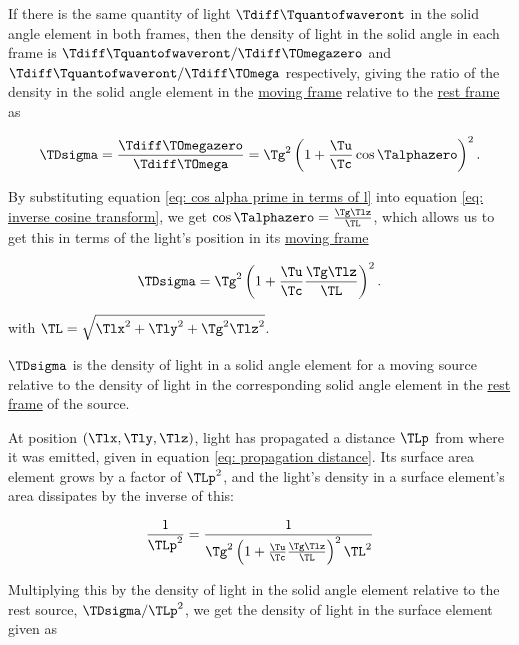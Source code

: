 \begin{derivation}
	If there is the same quantity of light $\Tdiff \Tquantofwaveront $ in the solid angle element in both frames, then the density of light in the solid angle in each frame is $\Tdiff \Tquantofwaveront /\Tdiff \TOmegazero $ and $\Tdiff \Tquantofwaveront /\Tdiff \TOmega $ respectively, giving the ratio of the density in the solid angle element in the \hyperlink{def-Moving-Frame}{moving frame} relative to the \hyperlink{def-proper-frame}{rest frame} as

	\begin{equation}
		\TDsigma  = \frac{\Tdiff \TOmegazero }{\Tdiff \TOmega } = \Tg ^2\left(1 + \dfrac{\Tu }{\Tc }\cos{\Talphazero }\right)^2.
	\end{equation}

	By substituting equation \eqref{eq: cos alpha prime in terms of l} into equation \eqref{eq: inverse cosine transform}, we get $\cos\Talphazero =\frac{\Tg  \Tlz  }{\TL }$, which allows us to get this in terms of the light's position in its \hyperlink{def-Moving-Frame}{moving frame}

	\begin{equation}
		\TDsigma  = \Tg ^2 \left(1 + \dfrac{\Tu }{\Tc }\frac{\Tg  \Tlz  }{\TL }\right)^2.
	\end{equation}

	with $\TL  = \sqrt{\Tlx ^2 + \Tly ^2 + \Tg ^2 \Tlz ^2}$.

	$\TDsigma $ is the density of light in a solid angle element for a moving source relative to the density of light in the corresponding solid angle element in the \hyperlink{def-proper-frame}{rest frame} of the source.

\end{derivation}

At position $(\Tlx ,\Tly ,\Tlz )$, light has propagated a distance $\TLp $ from where it was emitted, given in equation \eqref{eq: propagation distance}.
Its surface area element grows by a factor of $\TLp ^2$, and the light's density in a surface element's area dissipates by the inverse of this:

\begin{equation}
	\frac{1}{\TLp ^2} = \frac{1}{\Tg ^2 \left( 1 + \frac{\Tu }{\Tc } \frac{\Tg  \Tlz }{\TL } \right)^2 \TL ^2}
\end{equation}

Multiplying this by the density of light in the solid angle element relative to the rest source, $\TDsigma /\TLp ^2$, we get the density of light in the surface element given as

